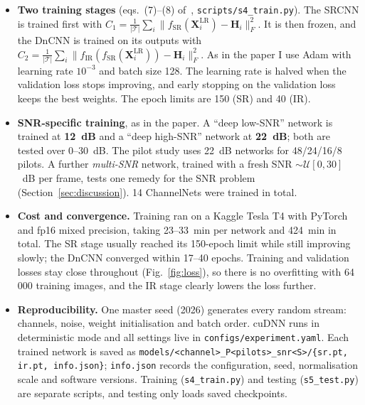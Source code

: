 \documentclass[10pt,a4paper]{article}
\newcommand{\code}[1]{\texttt{\small #1}}
\begin{document}
\begin{itemize}
  \item \textbf{Two training stages} (eqs.~(7)--(8) of~\cite{soltani}, \code{scripts/s4\_train.py}).
    The SRCNN is trained first with
    $C_1=\frac{1}{|\mathcal T|}\sum_i\|f_{\mathrm{SR}}(\mathbf X_i^{\mathrm{LR}})-\mathbf H_i\|_F^2$.
    It is then frozen, and the DnCNN is trained on its outputs with
    $C_2=\frac{1}{|\mathcal T|}\sum_i\|f_{\mathrm{IR}}(f_{\mathrm{SR}}(\mathbf X_i^{\mathrm{LR}}))-\mathbf H_i\|_F^2$.
    As in the paper I use Adam with learning rate $10^{-3}$ and batch size 128. The learning rate is
    halved when the validation loss stops improving, and early stopping on the validation loss keeps
    the best weights. The epoch limits are 150 (SR) and 40 (IR).
  \item \textbf{SNR-specific training}, as in the paper. A ``deep low-SNR'' network is trained at
    \textbf{12~dB} and a ``deep high-SNR'' network at \textbf{22~dB}; both are tested over 0--30~dB.
    The pilot study uses 22~dB networks for 48/24/16/8 pilots. A further \emph{multi-SNR} network,
    trained with a fresh SNR $\sim\mathcal U[0,30]$~dB per frame, tests one remedy for the SNR problem
    (Section~\ref{sec:discussion}). 14 ChannelNets were trained in total.
  \item \textbf{Cost and convergence.} Training ran on a Kaggle Tesla T4 with PyTorch and fp16 mixed
    precision, taking 23--33~min per network and 424~min in total. The SR stage usually reached its
    150-epoch limit while still improving slowly; the DnCNN converged within 17--40 epochs.
    Training and validation losses stay close throughout (Fig.~\ref{fig:loss}), so there is no
    overfitting with 64\,000 training images, and the IR stage clearly lowers the loss further.
  \item \textbf{Reproducibility.} One master seed (2026) generates every random stream: channels,
    noise, weight initialisation and batch order. cuDNN runs in deterministic mode and all settings
    live in \code{configs/experiment.yaml}. Each trained network is saved as
    \code{models/<channel>\_P<pilots>\_snr<S>/\{sr.pt, ir.pt, info.json\}}; \code{info.json} records the
    configuration, seed, normalisation scale and software versions. Training (\code{s4\_train.py}) and
    testing (\code{s5\_test.py}) are separate scripts, and testing only loads saved checkpoints.
\end{itemize}
\end{document}
